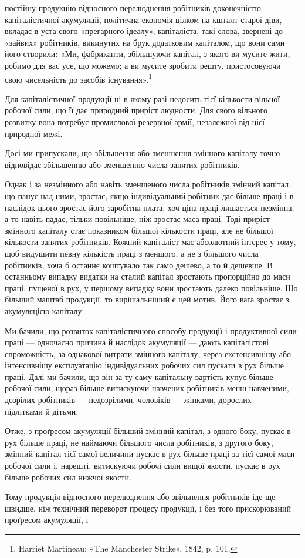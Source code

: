 постійну продукцію відносного перелюднення робітників доконечністю
капіталістичної акумуляції, політична економія цілком
на кшталт старої діви, вкладає в уста свого «прегарного
ідеалу», капіталіста, такі слова, звернені до «зайвих» робітників,
викинутих на брук додатковим капіталом, що вони сами його
створили: «Ми, фабриканти, збільшуючи капітал, з якого ви
мусите жити, робимо для вас усе, що можемо; а ви мусите зробити
решту, пристосовуючи свою чисельність до засобів існування».\footnote{
Harriet Martineau: «The Manchester Strike», 1842, p. 101.
}

Для капіталістичної продукції ні в якому разі недосить тієї
кількости вільної робочої сили, що її дає природний приріст
людности. Для свого вільного розвитку вона потребує промислової
резервної армії, незалежної від цієї природної межі.

Досі ми припускали, що збільшення або зменшення змінного
капіталу точно відповідає збільшенню або зменшенню числа
занятих робітників.

Однак і за незмінного або навіть зменшеного числа робітників
змінний капітал, що панує над ними, зростає, якщо індивідуальний
робітник дає більше праці і в наслідок цього зростає
його заробітна плата, хоч ціна праці лишається незмінна, а то
навіть падає, тільки повільніше, ніж зростає маса праці. Тоді
приріст змінного капіталу стає показником більшої кількости
праці, але не більшої кількости занятих робітників. Кожний
капіталіст має абсолютний інтерес у тому, щоб видушити певну
кількість праці з меншого, а не з більшого числа робітників,
хоча б останнє коштувало так само дешево, а то й дешевше.
В останньому випадку видатки на сталий капітал зростають
пропорційно до маси праці, пущеної в рух, у першому випадку
вони зростають далеко повільніше. Що більший маштаб продукції,
то вирішальніший є цей мотив. Його вага зростає з акумуляцією
капіталу.

Ми бачили, що розвиток капіталістичного способу продукції
і продуктивної сили праці — одночасно причина й наслідок
акумуляції — дають капіталістові спроможність, за однакової витрати
змінного капіталу, через екстенсивнішу або інтенсивнішу
експлуатацію індивідуальних робочих сил пускати в рух більше
праці. Далі ми бачили, що він за ту саму капітальну вартість
купує більше робочої сили, щораз більше витискуючи навчених
робітників менш навченими, дозрілих робітників — недозрілими,
чоловіків — жінками, дорослих — підлітками й дітьми.

Отже, з проґресом акумуляції більший змінний капітал, з
одного боку, пускає в рух більше праці, не наймаючи більшого
числа робітників, з другого боку, змінний капітал тієї самої
величини пускає в рух більше праці за тієї самої маси робочої
сили і, нарешті, витискуючи робочі сили вищої якости, пускає
в рух більше робочих сил нижчої якости.

Тому продукція відносного перелюднення або звільнення
робітників іде ще швидше, ніж технічний переворот процесу
продукції, і без того прискорюваний проґресом акумуляції, і
\parbreak{}  %
